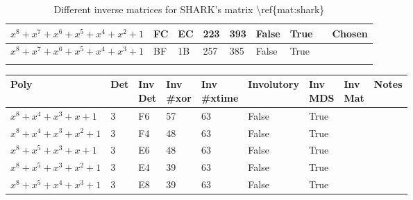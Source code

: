 \begin{footnotesize}
\begin{longtable}{|l|l|l|l|l|l|l|l|l|}
$x^8 + x^7 + x^6 + x^5 + x^4 + x^2 + 1$ & FC            & EC                & 223                 & 393                   & False               & True              &              & Chosen         \\ \hline
$x^8 + x^7 + x^6 + x^5 + x^4 + x^3 + 1$ & BF            & 1B                & 257                 & 385                   & False               & True              &              &                \\ \hline
\caption{Different inverse matrices for SHARK's matrix \textbackslash{}ref\{mat:shark\}}
\label{tab:poly-shark}\\
\end{longtable}
\end{footnotesize}


\begin{footnotesize}
\begin{longtable}{|l|l|l|l|l|l|l|l|l|}
\hline
\textbf{Poly}                           & \textbf{Det} & \shortstack{\textbf{Inv} \\ \textbf{Det}} & \shortstack{\textbf{Inv} \\ \textbf{\#xor}} & \shortstack{\textbf{Inv} \\ \textbf{\#xtime}} & \textbf{Involutory} & \shortstack{\textbf{Inv} \\ \textbf{MDS}} & \shortstack{\textbf{Inv} \\ \textbf{Mat}} & \textbf{Notes} \\ \hline
\endfirsthead
%
\endhead
%
$x^8 + x^4 + x^3 + x + 1$               & 3             & F6                & 57                  & 63                    & False               & True              &              &                \\ \hline
$x^8 + x^4 + x^3 + x^2 + 1$             & 3             & F4                & 48                  & 63                    & False               & True              &              &                \\ \hline
$x^8 + x^5 + x^3 + x + 1$               & 3             & E6                & 48                  & 63                    & False               & True              &              &                \\ \hline
$x^8 + x^5 + x^3 + x^2 + 1$             & 3             & E4                & 39                  & 63                    & False               & True              &              &                \\ \hline
$x^8 + x^5 + x^4 + x^3 + 1$             & 3             & E8                & 39                  & 63                    & False               & True              &              &                \\ \hline

\end{longtable}
\end{footnotesize}

